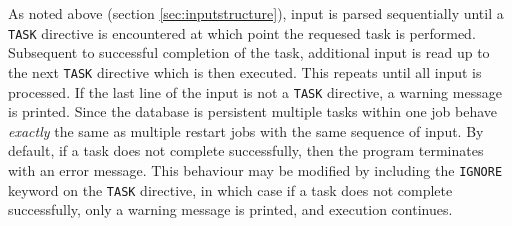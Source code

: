 As noted above (section \ref{sec:inputstructure}), input is parsed
sequentially until a \verb+TASK+ directive is encountered at which
point the requesed task is performed.  Subsequent to successful
completion of the task, additional input is read up to the next
\verb+TASK+ directive which is then executed.  This repeats until all
input is processed.  If the last line of the input is not a
\verb+TASK+ directive, a warning message is printed.  Since the
database is persistent multiple tasks within one job behave {\em
  exactly} the same as multiple restart jobs with the same sequence of
input.  By default, if a task does not complete successfully, then
the program terminates with an error message.  This behaviour may
be modified by including the \verb+IGNORE+ keyword on the \verb+TASK+
directive, in which case if a task does not complete successfully, 
only a warning message is printed, and execution continues.

